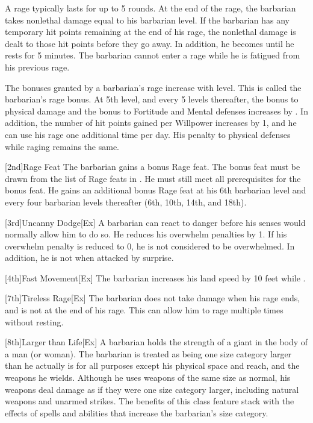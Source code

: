 A rage typically lasts for up to 5 rounds.
At the end of the rage, the barbarian takes nonlethal damage equal to his barbarian level.
If the barbarian has any temporary hit points remaining at the end of his rage, the nonlethal damage is dealt to those hit points before they go away.
In addition, he becomes \fatigued until he rests for 5 minutes.
The barbarian cannot enter a rage while he is fatigued from his previous rage.

The bonuses granted by a barbarian's rage increase with level.
This is called the barbarian's rage bonus.
At 5th level, and every 5 levels thereafter, the bonus to physical damage and the bonus to Fortitude and Mental defenses increases by .
In addition, the number of hit points gained per Willpower increases by 1, and he can use his rage one additional time per day.
His penalty to physical defenses while raging remains the same.

[2nd]{Rage Feat}
The barbarian gains a bonus Rage feat.
The bonus feat must be drawn from the list of Rage feats in .
He must still meet all prerequisites for the bonus feat.
He gains an additional bonus Rage feat at his 6th barbarian level and every four barbarian levels thereafter (6th, 10th, 14th, and 18th).

[3rd]{Uncanny Dodge}[Ex]
A barbarian can react to danger before his senses would normally allow him to do so.
He reduces his overwhelm penalties by 1.
If his overwhelm penalty is reduced to 0, he is not considered to be overwhelmed.
In addition, he is not \unaware when attacked by surprise.

[4th]{Fast Movement}[Ex]
The barbarian increases his land speed by 10 feet while \unencumbered.

[7th]{Tireless Rage}[Ex]
The barbarian does not take damage when his rage ends, and is not \fatigued at the end of his rage.
This can allow him to rage multiple times without resting.

[8th]{Larger than Life}[Ex]
A barbarian holds the strength of a giant in the body of a man (or woman).
The barbarian is treated as being one size category larger than he actually is for all purposes except his physical space and reach, and the weapons he wields.
Although he uses weapons of the same size as normal, his weapons deal damage as if they were one size category larger, including natural weapons and unarmed strikes.
The benefits of this class feature stack with the effects of spells and abilities that increase the barbarian's size category.

